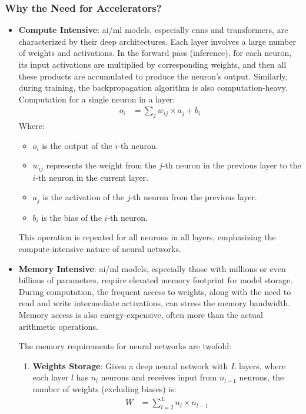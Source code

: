 \subsubsection{Why the Need for Accelerators?}
\begin{itemize}
	\item \textbf{Compute Intensive}: \gls{ai}/\gls{ml} models, especially \glspl{cnn} and transformers, are characterized by their deep architectures. Each layer involves a large number of weights and activations. In the forward pass (inference), for each neuron, its input activations are multiplied by corresponding weights, and then all these products are accumulated to produce the neuron's output. Similarly, during training, the backpropagation algorithm is also computation-heavy.
	Computation for a single neuron in a layer:
	\begin{align*}
	o_i &= \sum_{j} w_{ij} \times a_j + b_i
	\end{align*}
	Where:
	\begin{itemize}
		\item \( o_i \) is the output of the \(i\)-th neuron.
		\item \( w_{ij} \) represents the weight from the \(j\)-th neuron in the previous layer to the \(i\)-th neuron in the current layer.
		\item \( a_j \) is the activation of the \(j\)-th neuron from the previous layer.
		\item \( b_i \) is the bias of the \(i\)-th neuron.
	\end{itemize}
	This operation is repeated for all neurons in all layers, emphasizing the compute-intensive nature of neural networks.
	
	\item \textbf{Memory Intensive}: \gls{ai}/\gls{ml} models, especially those with millions or even billions of parameters, require elevated memory footprint for model storage. During computation, the frequent access to weights, along with the need to read and write intermediate activations, can stress the memory bandwidth. Memory access is also energy-expensive, often more than the actual arithmetic operations.
	
	The memory requirements for neural networks are twofold:
	\begin{enumerate}
		\item \textbf{Weights Storage}: Given a deep neural network with \(L\) layers, where each layer \(l\) has \(n_l\) neurons and receives input from \(n_{l-1}\) neurons, the number of weights (excluding biases) is:
		\begin{align*}
		W &= \sum_{l=2}^{L} n_l \times n_{l-1}
		\end{align*}
		

\end{enumerate}
\end{itemize}
